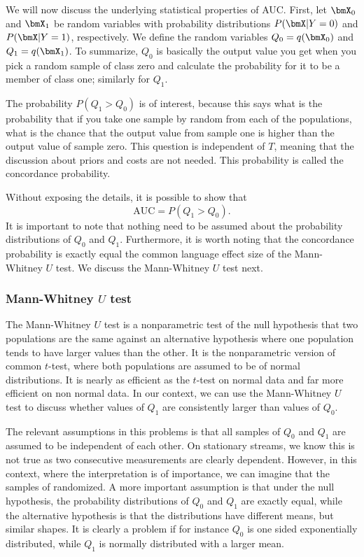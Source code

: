 We will now discuss the underlying statistical properties of AUC. First, let $\bmX_0$ and $\bmX_1$ be random variables with probability distributions $P(\bmX | Y = 0)$ and $P(\bmX | Y = 1)$, respectively.  We define the random variables $Q_0 = q(\bmX_0)$ and $Q_1 = q(\bmX_1)$.  To summarize, $Q_0$ is basically the output value you get when you pick a random sample of class zero and calculate the probability for it to be a member of class one; similarly for $Q_1$.  

The probability $P(Q_1 > Q_0)$ is of interest, because this says what is the probability that if you take one sample by random from each of the populations, what is the chance that the output value from sample one is higher than the output value of sample zero.  This question is independent of $T$, meaning that the discussion about priors and costs are not needed. This probability is called the concordance probability.

Without exposing the details, it is possible to show that
\begin{equation}
\label{eq:concurrent}
\mbox{AUC} = P(Q_1 > Q_0).
\end{equation}
It is important to note that nothing need to be assumed about the probability distributions of $Q_0$ and $Q_1$.  Furthermore, it is worth noting that the concordance probability is exactly equal the common language effect size of the Mann-Whitney $U$ test.  We discuss the Mann-Whitney $U$ test next.

\subsubsection{Mann-Whitney $U$ test}
\label{sec:U}

The Mann-Whitney $U$ test is a nonparametric test of the null hypothesis that two populations are the same against an alternative hypothesis where one population tends to have larger values than the other.  It is the nonparametric version of common $t$-test, where both populations are assumed to be of normal distributions.  It is nearly as efficient as the $t$-test on normal data and far more efficient on non normal data.  In our context, we can use the Mann-Whitney $U$ test to discuss whether values of $Q_1$ are consistently larger than values of $Q_0$.  

The relevant assumptions in this problems is that all samples of $Q_0$ and $Q_1$ are assumed to be independent of each other.  On stationary streams, we know this is not true as two consecutive measurements are clearly dependent.  However, in this context, where the interpretation is of importance, we can imagine that the samples of randomized.  A more important assumption is that under the null hypothesis, the probability distributions of $Q_0$ and $Q_1$ are exactly equal, while the alternative hypothesis is that the distributions have different means, but similar shapes.  It is clearly a problem if for instance $Q_0$ is one sided exponentially distributed, while $Q_1$ is normally distributed with a larger mean.   

